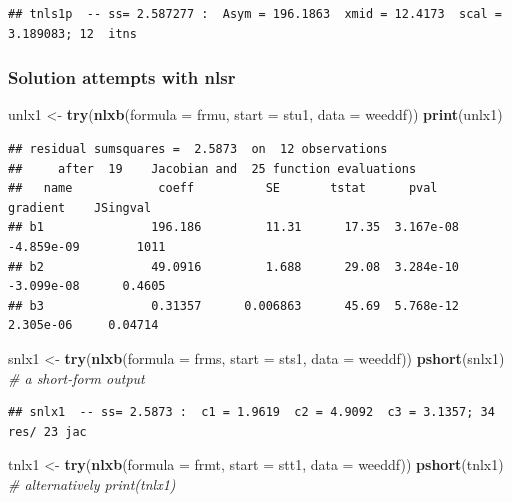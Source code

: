 \documentclass[
]{article}
\newenvironment{Shaded}{\begin{snugshade}}{\end{snugshade}}
\newcommand{\AttributeTok}[1]{\textcolor[rgb]{0.13,0.29,0.53}{#1}}
\newcommand{\CommentTok}[1]{\textcolor[rgb]{0.56,0.35,0.01}{\textit{#1}}}
\newcommand{\FunctionTok}[1]{\textcolor[rgb]{0.13,0.29,0.53}{\textbf{#1}}}
\newcommand{\NormalTok}[1]{#1}
\newcommand{\OtherTok}[1]{\textcolor[rgb]{0.56,0.35,0.01}{#1}}
\begin{document}
\begin{verbatim}
## tnls1p  -- ss= 2.587277 :  Asym = 196.1863  xmid = 12.4173  scal = 3.189083; 12  itns
\end{verbatim}

\hypertarget{solution-attempts-with-nlsr}{%
\subsubsection{Solution attempts with
nlsr}\label{solution-attempts-with-nlsr}}

\begin{Shaded}
\begin{Highlighting}[]
\NormalTok{unlx1 }\OtherTok{\textless{}{-}} \FunctionTok{try}\NormalTok{(}\FunctionTok{nlxb}\NormalTok{(}\AttributeTok{formula =}\NormalTok{ frmu, }\AttributeTok{start =}\NormalTok{ stu1, }\AttributeTok{data =}\NormalTok{ weeddf))}
\FunctionTok{print}\NormalTok{(unlx1) }
\end{Highlighting}
\end{Shaded}

\begin{verbatim}
## residual sumsquares =  2.5873  on  12 observations
##     after  19    Jacobian and  25 function evaluations
##   name            coeff          SE       tstat      pval      gradient    JSingval   
## b1               196.186         11.31      17.35  3.167e-08  -4.859e-09        1011  
## b2               49.0916         1.688      29.08  3.284e-10  -3.099e-08      0.4605  
## b3               0.31357      0.006863      45.69  5.768e-12   2.305e-06     0.04714
\end{verbatim}

\begin{Shaded}
\begin{Highlighting}[]
\NormalTok{snlx1 }\OtherTok{\textless{}{-}} \FunctionTok{try}\NormalTok{(}\FunctionTok{nlxb}\NormalTok{(}\AttributeTok{formula =}\NormalTok{ frms, }\AttributeTok{start =}\NormalTok{ sts1, }\AttributeTok{data =}\NormalTok{ weeddf))}
\FunctionTok{pshort}\NormalTok{(snlx1) }\CommentTok{\# a short{-}form output}
\end{Highlighting}
\end{Shaded}

\begin{verbatim}
## snlx1  -- ss= 2.5873 :  c1 = 1.9619  c2 = 4.9092  c3 = 3.1357; 34 res/ 23 jac
\end{verbatim}

\begin{Shaded}
\begin{Highlighting}[]
\NormalTok{tnlx1 }\OtherTok{\textless{}{-}} \FunctionTok{try}\NormalTok{(}\FunctionTok{nlxb}\NormalTok{(}\AttributeTok{formula =}\NormalTok{ frmt, }\AttributeTok{start =}\NormalTok{ stt1, }\AttributeTok{data =}\NormalTok{ weeddf))}
\FunctionTok{pshort}\NormalTok{(tnlx1) }\CommentTok{\# alternatively print(tnlx1)}
\end{Highlighting}
\end{Shaded}
\end{document}
